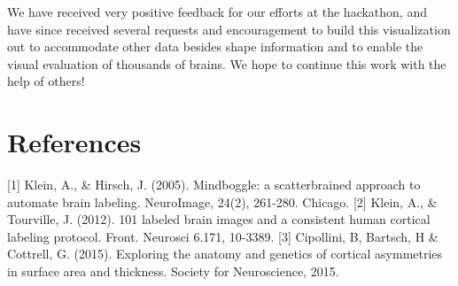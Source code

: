 \documentclass[twocolumn]{bmcart}%
\begin{document}
We have received very positive feedback for our efforts at the
hackathon, and have since received several requests and encouragement to
build this visualization out to accommodate other data besides shape
information and to enable the visual evaluation of thousands of brains.
We hope to continue this work with the help of others!

\section{References}\label{references}

{[}1{]} Klein, A., \& Hirsch, J. (2005). Mindboggle: a scatterbrained
approach to automate brain labeling. NeuroImage, 24(2), 261-280.
Chicago. {[}2{]} Klein, A., \& Tourville, J. (2012). 101 labeled brain
images and a consistent human cortical labeling protocol. Front.
Neurosci 6.171, 10-3389. {[}3{]} Cipollini, B, Bartsch, H \& Cottrell,
G. (2015). Exploring the anatomy and genetics of cortical asymmetries in
surface area and thickness. Society for Neuroscience, 2015.

\end{document}
